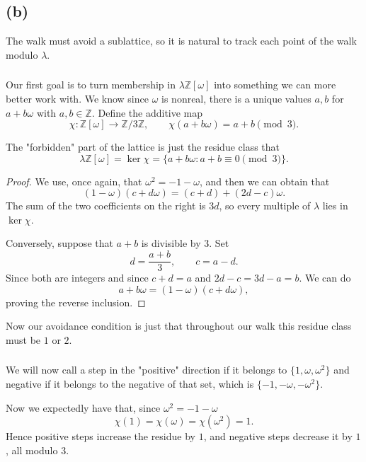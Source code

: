 \documentclass[11pt]{scrartcl}
\begin{document}
\subsection{(b)}

\begin{soln}
The walk must avoid a sublattice, so it is natural to track each point of the walk
modulo $\lambda$.
	\subsubsection*{}
	
	Our first goal is to turn membership in $\lambda\mathbb Z[\omega]$ into something we can more better work with.
     We know since $\omega$ is nonreal, there is a unique values $a,b$ for $a+b\omega$ with $a,b\in\mathbb Z$. Define the additive map
	\[
	\chi:\mathbb Z[\omega]\longrightarrow\mathbb Z/3\mathbb Z,
	\qquad
	\chi(a+b\omega)=a+b\pmod 3.
	\]	
	\begin{claim*}
		The "forbidden" part of the lattice is just the residue class that
		\[
		\lambda\mathbb Z[\omega]
		=\ker\chi
		=\{a+b\omega: a+b\equiv0\pmod3\}.
		\]
	\end{claim*}
	
	\begin{proof}
		We use, once again, that $\omega^2=-1-\omega$, and then we can obtain that
		\[
		(1-\omega)(c+d\omega)=(c+d)+(2d-c)\omega.
		\]
		The sum of the two coefficients on the right is $3d$, so every multiple
		of $\lambda$ lies in $\ker\chi$.
		
		Conversely, suppose that $a+b$ is divisible by $3$. Set
		\[
		d=\frac{a+b}{3},
		\qquad
		c=a-d.
		\]
		Since both are integers and since $c+d=a$ and $2d-c=3d-a=b$. We can do
		\[
		a+b\omega=(1-\omega)(c+d\omega),
		\]
		proving the reverse inclusion.
	\end{proof}
	
Now our avoidance condition is just that throughout our walk this residue class must be $1$ or $2$.
	
	\subsubsection*{}
	We will now call a step in the "positive" direction if it belongs to $\{1,\omega,\omega^2\}$ and negative if it belongs to the negative of that set, which is $\{-1,-\omega,-\omega^2\}$. 
	
	Now we expectedly have that, since $\omega^2=-1-\omega$
	\[
	\chi(1)=\chi(\omega)=\chi(\omega^2)=1.
	\]
	Hence positive steps increase the residue by $1$, and negative steps
	decrease it by $1$, all modulo $3$.
	

\end{soln}
\end{document}
